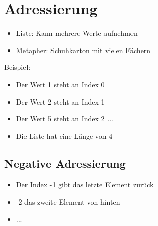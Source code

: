 \section{Adressierung}
\begin{frame}
	\slidehead

	\begin{itemize}
		\item Liste: Kann mehrere Werte aufnehmen
		\item Metapher: Schuhkarton mit vielen Fächern
	\end{itemize}

	\begin{figure}[!h]
		\centering


	\end{figure}
	\pause
	Beispiel:\\
	\begin{itemize}
		\item Der Wert 1 steht an Index 0
		\item Der Wert 2 steht an Index 1
		\item Der Wert 5 steht an Index 2 ...
		\item Die Liste hat eine Länge von 4
	\end{itemize}
\end{frame}

\subsection{Negative Adressierung}
\begin{frame}
	\slidehead
	\begin{itemize}
		\item Der Index -1 gibt das letzte Element zurück
		\item -2 das zweite Element von hinten
		\item ...
	\end{itemize}
\end{frame}


